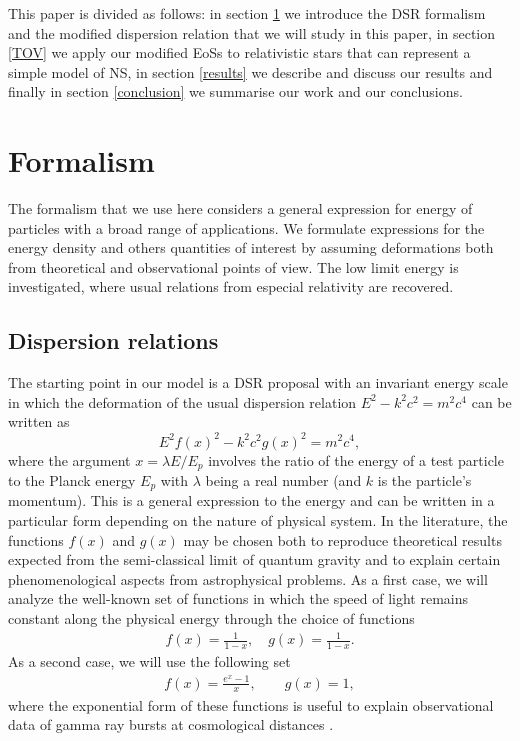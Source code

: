 \documentclass[final,5p,times,twocolumn]{elsarticle}
\begin{document}
This paper is divided as follows: in section \ref{formal} we introduce the DSR formalism and the modified dispersion relation that we will study in this paper, in section \ref{TOV} we apply our modified EoSs to relativistic stars that can represent a simple model of NS, in section \ref{results} we describe and discuss our results and finally in section \ref{conclusion} we summarise our work and our conclusions.

\section{Formalism} \label{formal}

The formalism that we use here considers a general expression for energy of particles with a broad range of applications. We formulate expressions for the energy density and others quantities of interest by assuming deformations both from theoretical and observational points of view. The low limit energy is investigated, where usual relations from especial relativity are recovered.    


\subsection{Dispersion relations}
\label{Rainbowtheory}
The starting point in our model is a
DSR proposal with an invariant energy scale in which the deformation of the usual dispersion relation  $E^2-k^2c^2=m^2 c^4$ can be written as 
\begin{equation}
    E^2 f(x)^{2} - k^2 c^2 g(x)^{2} = m^2 c^4,
    \label{eq0}
\end{equation}
where the argument $x=\lambda E/E_{p}$ involves the ratio of the energy of a test particle to the Planck energy $E_{p}$ with $\lambda$ being a real number (and $k$ is the particle's momentum). This is a general expression to the energy and can be written in a particular form depending on the nature of physical system. In the literature, the functions $f(x)$ and $g(x)$ may be chosen both to reproduce theoretical results expected from the semi-classical limit of quantum gravity and to explain certain phenomenological aspects from astrophysical problems. As a first case, we will analyze the well-known set of functions in which the speed of light remains constant along the physical energy 
\cite{dispersao8} through the choice of functions 
\begin{align}
f(x)=\frac{1}{1-x},\quad g(x)=\frac{1}{1-x}.  
\label{eq1}
\end{align}
As a second case, we will use the following set
\begin{align}
     f(x)=\frac{e^x -1}{x}, \qquad g(x)=1, 
    \label{eq2}
\end{align}
where the exponential form of these functions is useful to explain observational data of gamma ray bursts at cosmological distances \cite{caso2uso1,caso2uso2}.
\end{document}
